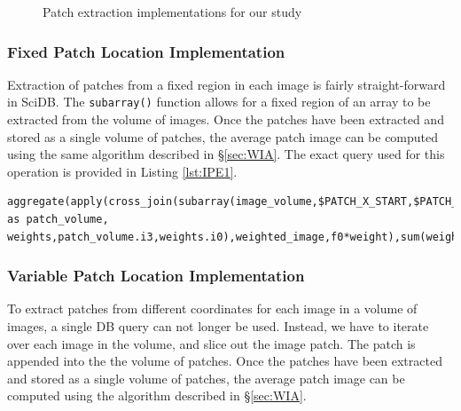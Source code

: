 \documentclass[letterpaper,twocolumn,10pt]{article}
\begin{document}
\begin{figure}[htp]
\centering
	 \hspace{1 em}
	\caption{Patch extraction implementations for our study}
	\label{fig:patch}
\end{figure}


\subsubsection{Fixed Patch Location Implementation}
Extraction of patches from a fixed region in each image is fairly straight-forward in SciDB. The \texttt{subarray()} function allows for a fixed region of an array to be extracted from the volume of images. Once the patches have been extracted and stored as a single volume of patches, the average patch image can be computed using the same algorithm described in \S \ref{sec:WIA}. The exact query used for this operation is provided in Listing \ref{lst:IPE1}.

\begin{lstlisting}[caption=Fixed Image Patch Extraction, frame=single, label=lst:IPE1, float]
aggregate(apply(cross_join(subarray(image_volume,$PATCH_X_START,$PATCH_Y_START,0,0,$PATCH_X_END,$PATCH_Y_END,2,$NUM_FILES) as patch_volume, weights,patch_volume.i3,weights.i0),weighted_image,f0*weight),sum(weighted_image),i0,i1,i2);
\end{lstlisting}

\subsubsection{Variable Patch Location Implementation}
To extract patches from different coordinates for each image in a volume of images, a single DB query can not longer be used. Instead, we have to iterate over each image in the volume, and slice out the image patch. The patch is appended into the the volume of patches. Once the patches have been extracted and stored as a single volume of patches, the average patch image can be computed using the algorithm described in \S \ref{sec:WIA}.
\end{document}
